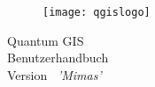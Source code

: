 
\begin{titlepage}
\begin{center}

\begin{figure}[H]
\begin{center}
\texttt{[image: qgislogo]} 
\end{center}
\end{figure}

\Huge{Quantum GIS}\\
\vspace{0.5cm}
\Large{Benutzerhandbuch} \\
\vspace{0.5cm}
\Large{Version ~\CURRENT \textsl{'Mimas'}}

\end{center}
\end{titlepage}

